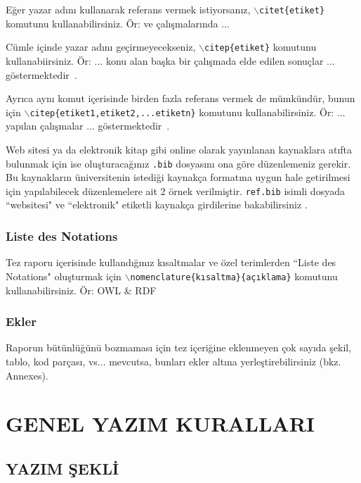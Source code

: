Eğer yazar adını kullanarak referans vermek istiyorsanız, $\backslash$\texttt{citet\{etiket\}} komutunu kullanabilirsiniz. Ör: \citet{konf-bildirisi1} ve \citet{makale2} çalışmalarında ... 

Cümle içinde yazar adını geçirmeyecekseniz, $\backslash$\texttt{citep\{etiket\}} komutunu kullanabiirsiniz.  Ör: ... konu alan başka bir çalışmada elde edilen sonuçlar ... göstermektedir~\citep{makale1}.

Ayrıca aynı komut içerisinde birden fazla referans vermek de mümkündür, bunun için $\backslash$\texttt{citep\{etiket1,etiket2,...etiketn\}} komutunu kullanabilirsiniz. Ör: ... yapılan çalışmalar ... göstermektedir~\citep{kitap1,kitapbolumu1,kitap2,tez1}.

Web sitesi ya da elektronik kitap gibi online olarak yayınlanan kaynaklara atıfta bulunmak için ise oluşturacağınız \texttt{.bib} dosyasını ona göre düzenlemeniz gerekir. Bu kaynakların üniversitenin istediği kaynakça formatına uygun hale getirilmesi için yapılabilecek düzenlemelere ait 2 örnek verilmiştir. \texttt{ref.bib} isimli dosyada ``websitesi" ve ``elektronik" etiketli kaynakça girdilerine bakabilirsiniz \citep{elektronik,websitesi}. 

\subsection{Liste des Notations}
Tez raporu içerisinde kullandığınız kısaltmalar ve özel terimlerden ``Liste des Notations" oluşturmak için $\backslash$\texttt{nomenclature\{kısaltma\}\{açıklama\}} komutunu kullanabilirsiniz. Ör:  OWL \& RDF  

\subsection{Ekler}
Raporun bütünlüğünü bozmaması için tez içeriğine eklenmeyen çok sayıda şekil, tablo, kod parçası, vs... mevcutsa, bunları ekler altına yerleştirebilirsiniz (bkz. Annexes).





\chapter{GENEL YAZIM KURALLARI}
\thispagestyle{empty} %

\section{YAZIM ŞEKLİ}
